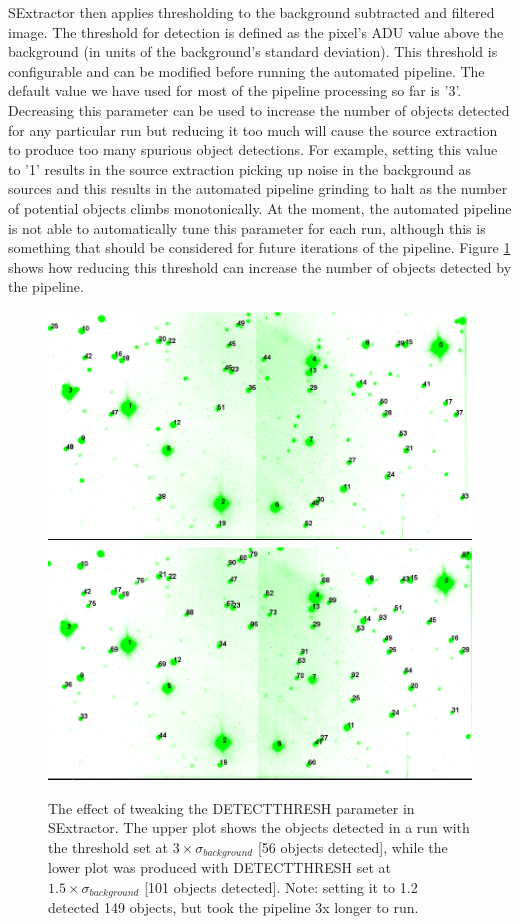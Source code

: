 SExtractor then applies thresholding to the background subtracted and filtered image. The threshold for detection is defined as the pixel's ADU value above the background (in units of the background's standard deviation). This threshold is configurable and can be modified before running the automated pipeline. The default value we have used for most of the pipeline processing so far is '3'. Decreasing this parameter can be used to increase the number of objects detected for any particular run but reducing it too much will cause the source extraction to produce too many spurious object detections. For example, setting this value to '1' results in the source extraction picking up noise in the background as sources and this results in the automated pipeline grinding to halt as the number of potential objects climbs monotonically. At the moment, the automated pipeline is not able to automatically tune this parameter for each run, although this is something that should be considered for future iterations of the pipeline. Figure \ref{fig:tweakingthreshold} shows how reducing this threshold can increase the number of objects detected by the pipeline.

\begin{figure}
  \centering
  \includegraphics[width=.8\linewidth]{images/2012-09-03_g_default.png}
  \includegraphics[width=.8\linewidth]{images/2012-09-03_g_15sigma.png}
  \caption{The effect of tweaking the DETECT\textunderscore THRESH parameter in SExtractor. The upper plot shows the objects detected in a run with the threshold set at $ 3\times \sigma_{background}$ [56 objects detected], while the lower plot was produced with DETECT\textunderscore THRESH set at $ 1.5\times \sigma_{background}$  [101 objects detected]. Note: setting it to 1.2 detected 149 objects, but took the pipeline 3x longer to run. }
\label{fig:tweakingthreshold}
\end{figure}

